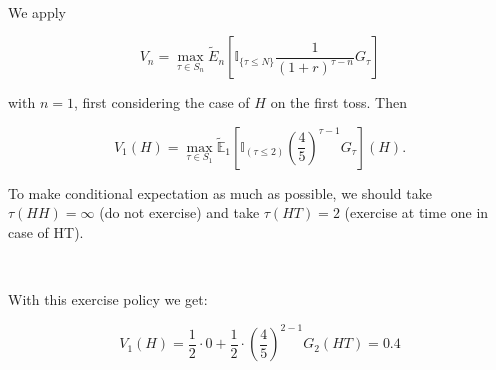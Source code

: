 \documentclass[c, dvipsnames, 8pt]{beamer}
\begin{document}
\begin{frame}[shrink=5]

\frametitle{\insertsection} 
\framesubtitle{\insertsubsection} 

\

We apply

\begin{equation}\label{e1}
V_n = \max_{\tau \in S_n} \tilde{E}_n [\mathbb{I}_{\{\tau \leq N\}} \dfrac{1}{(1+r)^{\tau-n}}G_{\tau}]
\end{equation}


with $n=1$, first considering the case of $H$ on the first toss. Then 

\begin{equation}\label{key}
V_1(H)=\max\limits_{{\tau \in S_1}}\widetilde{\mathbb{E}}_1\left [ \mathbb{I}_{(\tau\leq 2)}\left ( \frac{4}{5} \right )^{\tau-1}G_\tau \right ](H).
\end{equation}

To make conditional expectation as much as possible, we should take $\tau(HH)=\infty$  (do not exercise) and take $\tau(HT)= 2$ (exercise at time one in case of HT).

\

With this exercise policy we get:


\begin{equation}\label{key}
V_1(H)= \frac{1}{2}\cdot 0 + \frac{1}{2} \cdot \left ( \frac{4}{5} \right )^{2-1}G_2(HT) = 0.4
\end{equation}

\end{frame}
\end{document}
